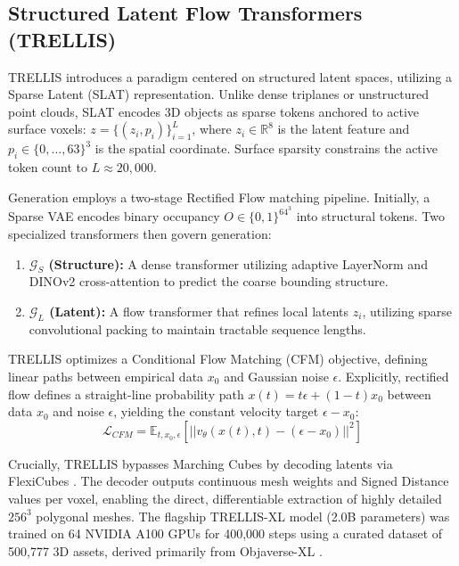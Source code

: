\documentclass[10pt, conference]{IEEEtran}
\begin{document}
\subsection{Structured Latent Flow Transformers (TRELLIS)}
TRELLIS \cite{trellis2024} introduces a paradigm centered on structured latent spaces, utilizing a Sparse Latent (SLAT) representation. Unlike dense triplanes or unstructured point clouds, SLAT encodes 3D objects as sparse tokens anchored to active surface voxels: $z = \{(z_i, p_i)\}_{i=1}^L$, where $z_i \in \mathbb{R}^8$ is the latent feature and $p_i \in \{0, \dots, 63\}^3$ is the spatial coordinate. Surface sparsity constrains the active token count to $L \approx 20,000$.

Generation employs a two-stage Rectified Flow matching pipeline. Initially, a Sparse VAE encodes binary occupancy $O \in \{0, 1\}^{64^3}$ into structural tokens. Two specialized transformers then govern generation:
\begin{enumerate}
    \item \textbf{$\mathcal{G}_S$ (Structure):} A dense transformer utilizing adaptive LayerNorm and DINOv2 cross-attention to predict the coarse bounding structure.
    \item \textbf{$\mathcal{G}_L$ (Latent):} A flow transformer that refines local latents $z_i$, utilizing sparse convolutional packing to maintain tractable sequence lengths.
\end{enumerate}

TRELLIS optimizes a Conditional Flow Matching (CFM) objective, defining linear paths between empirical data $x_0$ and Gaussian noise $\epsilon$. Explicitly, rectified flow defines a straight-line probability path $x(t) = t \epsilon + (1-t) x_0$ between data $x_0$ and noise $\epsilon$, yielding the constant velocity target $\epsilon - x_0$:
\begin{equation}
\mathcal{L}_{CFM} = \mathbb{E}_{t, x_0, \epsilon} [||v_\theta(x(t), t) - (\epsilon - x_0)||^2]
\end{equation}

Crucially, TRELLIS bypasses Marching Cubes by decoding latents via FlexiCubes \cite{flexicubes2023}. The decoder outputs continuous mesh weights and Signed Distance values per voxel, enabling the direct, differentiable extraction of highly detailed $256^3$ polygonal meshes. The flagship TRELLIS-XL model (2.0B parameters) was trained on 64 NVIDIA A100 GPUs for 400,000 steps using a curated dataset of 500,777 3D assets, derived primarily from Objaverse-XL \cite{objaverse}.
\end{document}
